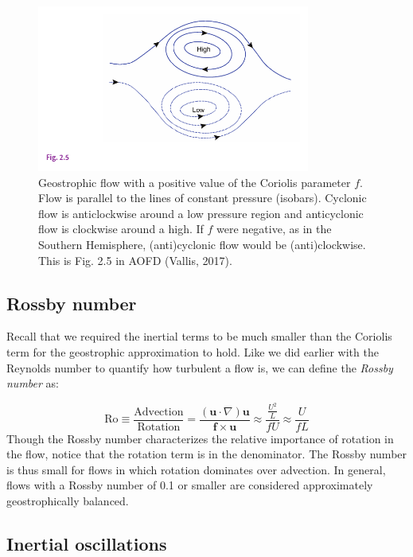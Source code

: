\documentclass[12pt]{article}
\numberwithin{equation}{section}
\numberwithin{figure}{section}
\numberwithin{table}{section}
\begin{document}
\begin{figure}[h]
  \centering
  \includegraphics[width=0.8\textwidth]{assets/fig_geostrophic_balance.pdf}
  \caption{
    Geostrophic flow with a positive value of the Coriolis parameter $f$.
    Flow is parallel to the lines of constant pressure (isobars).
    Cyclonic flow is anticlockwise around a low pressure region and
    anticyclonic flow is clockwise around a high. If $f$ were negative, as in
    the Southern Hemisphere, (anti)cyclonic flow would be (anti)clockwise.
    This is Fig. 2.5 in AOFD (Vallis, 2017).
  }
  \label{fig:geostrophic_flow}
\end{figure}

\subsection{Rossby number}

Recall that we required the inertial terms to be much smaller than the Coriolis
term for the geostrophic approximation to hold.
Like we did earlier with the Reynolds number to quantify how turbulent a flow is,
we can define the \textit{Rossby number} as:

\begin{equation}
  \text{Ro} \equiv
  \frac{\text{Advection}}{\text{Rotation}} = 
  \frac{\left( \mathbf{u} \cdot \nabla \right) \mathbf{u}}{\mathbf{f} \times \mathbf{u}}
  \approx \frac{\frac{U^2}{L}}{fU}
  \approx \frac{U}{fL}
\end{equation}
Though the Rossby number characterizes the relative importance of rotation in
the flow, notice that the rotation term is in the denominator.
The Rossby number is thus small for flows in which rotation dominates over
advection.
In general, flows with a Rossby number of 0.1 or smaller are considered
approximately geostrophically balanced.

\subsection{Inertial oscillations}
\end{document}
